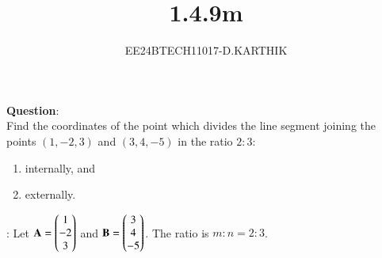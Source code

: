 \documentclass[journal]{IEEEtran}
\begin{document}

\vspace{3cm}

\title{1.4.9m}
\author{EE24BTECH11017-D.KARTHIK}
\maketitle

\renewcommand{\thefigure}{\theenumi}
\renewcommand{\thetable}{\theenumi}
\setlength{\intextsep}{10pt}

\renewcommand{\thetable}{\theenumi}

\textbf{Question}:\\
Find the coordinates of the point which divides the line segment joining the points \( (1, -2, 3) \) and \( (3, 4, -5) \) in the ratio \( 2:3 \):
\begin{enumerate}
    \item internally, and
    \item externally.
\end{enumerate}

\solution:
Let \(\mathbf{A} = \begin{pmatrix}1 \\ -2 \\ 3\end{pmatrix}\) and \(\mathbf{B} = \begin{pmatrix}3 \\ 4 \\ -5\end{pmatrix}\). The ratio is \(m:n = 2:3\).
\end{document}
